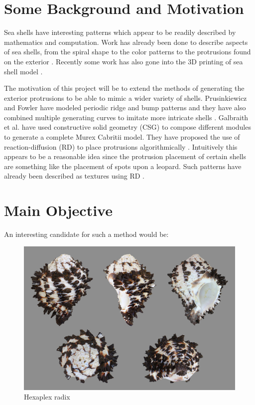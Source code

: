 
\section*{Some Background and Motivation}

Sea shells have interesting patterns which  appear to be readily described by mathematics and computation. Work has already been done to describe aspects of sea shells, from the spiral shape to the color patterns to the protrusions found on the exterior \cite{Galbraith00modelingmurex}\cite{abss}\cite{VANDERHELM1998505}. Recently some work has also gone into the 3D printing of sea shell model \cite{3dprinting-seashells}\cite{bachman-3dprinting}.

The motivation of this project will be to extend the methods of generating the exterior protrusions to be able to mimic a wider variety of shells. Prusinkiewicz and Fowler have modeled periodic ridge and bump patterns and they have also combined multiple generating curves to imitate more intricate shells \cite{abss}. Galbraith et al. have used constructive solid geometry (CSG) to compose different modules to generate a complete Murex Cabritii model. They have proposed the use of reaction-diffusion (RD) to place protrusions algorithmically \cite{Galbraith00modelingmurex}. Intuitively this appears to be a reasonable idea since the protrusion placement of certain shells are something like the placement of spots upon a leopard. Such patterns have already been described as textures using RD \cite{Turk:1991:GTA:127719.122749}.

\section*{Main Objective}

An interesting candidate for such a method would be:

\begin{figure}[h]
	\centering\includegraphics[scale=0.25]{./img/hexaplex_radix.jpg}
	\caption{Hexaplex radix \cite{wikipedia-hexaplex}}
	\label{fig:hexaplex-radix} %
\end{figure}

